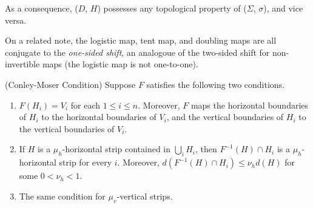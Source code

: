 \documentclass[12pt,twoside,draft]{book}
\begin{document}
As a consequence, ($D$, $H$) possesses any topological property of ($\Sigma$, $\sigma$), and vice versa.

On a related note, the logistic map, tent map, and doubling maps are all conjugate to the \textit{one-sided shift}, an analogoue of the two-sided shift for non-invertible maps (the logistic map is not one-to-one).

\begin{theorem}
  (Conley-Moser Condition)
  Suppose $F$ satisfies the following two conditions.
  \begin{enumerate}
    \item $F(H_i) = V_i$ for each $1 \leq i \leq n$.
          Moreover, $F$ maps the horizontal boundaries of $H_i$ to the horizontal boundaries of $V_i$, and the vertical boundaries of $H_i$ to the vertical boundaries of $V_i$.
    \item If $H$ is a $\mu_h$-horizontal strip contained in $\bigcup_{i} H_i$, then $F^{-1}(H) \cap H_i$ is a $\mu_h$-horizontal strip for every $i$.
          Moreover, $d(F^{-1}(H) \cap H_i) \leq \nu_h d(H)$ for some $0 < \nu_h < 1$.
    \item The same condition for $\mu_v$-vertical strips.
  \end{enumerate}
  \label{thm:conley-moser}
\end{theorem}




\printindex
\end{document}
